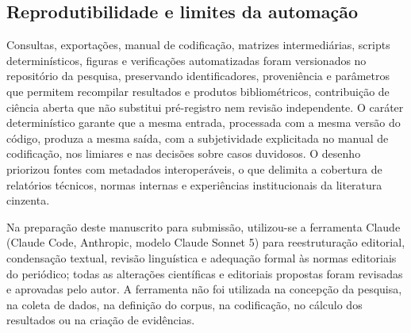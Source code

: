 \subsection{Reprodutibilidade e limites da automação}

Consultas, exportações, manual de codificação, matrizes intermediárias, scripts determinísticos, figuras e verificações automatizadas foram versionados no repositório da pesquisa, preservando identificadores, proveniência e parâmetros que permitem recompilar resultados e produtos bibliométricos, contribuição de ciência aberta que não substitui pré-registro nem revisão independente. O caráter determinístico garante que a mesma entrada, processada com a mesma versão do código, produza a mesma saída, com a subjetividade explicitada no manual de codificação, nos limiares e nas decisões sobre casos duvidosos. O desenho priorizou fontes com metadados interoperáveis, o que delimita a cobertura de relatórios técnicos, normas internas e experiências institucionais da literatura cinzenta.

Na preparação deste manuscrito para submissão, utilizou-se a ferramenta Claude (Claude Code, Anthropic, modelo Claude Sonnet 5) para reestruturação editorial, condensação textual, revisão linguística e adequação formal às normas editoriais do periódico; todas as alterações científicas e editoriais propostas foram revisadas e aprovadas pelo autor. A ferramenta não foi utilizada na concepção da pesquisa, na coleta de dados, na definição do corpus, na codificação, no cálculo dos resultados ou na criação de evidências.
